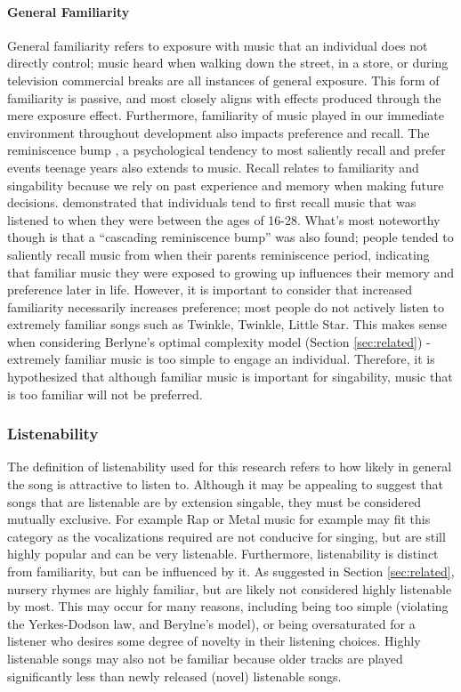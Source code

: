 \paragraph{General Familiarity}
General familiarity refers to exposure with music that an individual does not directly control; music heard when walking down the street, in a store, or during television commercial breaks are all instances of general exposure. This form of familiarity is passive, and most closely aligns with effects produced through the mere exposure effect. Furthermore, familiarity of music played in our immediate environment throughout development also impacts preference and recall. The reminiscence bump \cite{rubin8c}, a psychological tendency to most saliently recall and prefer events teenage years also extends to music. Recall relates to familiarity and singability because we rely on past experience and memory when making future decisions. \cite{Krumhansl2013} demonstrated that individuals tend to first recall music that was listened to when they were between the ages of 16-28. What's most noteworthy though is that a ``cascading reminiscence bump'' was also found; people tended to saliently recall music from when their parents reminiscence period, indicating that familiar music they were exposed to growing up influences their memory and preference later in life. However, it is important to consider that increased familiarity necessarily increases preference; most people do not actively listen to extremely familiar songs such as Twinkle, Twinkle, Little Star. This makes sense when considering Berlyne's optimal complexity model (Section \ref{sec:related}) - extremely familiar music is too simple to engage an individual. Therefore, it is hypothesized that although familiar music is important for singability, music that is too familiar will not be preferred.

\subsubsection{Listenability}
The definition of listenability used for this research refers to how likely in general the song is attractive to listen to. Although it may be appealing to suggest that songs that are listenable are by extension singable, they must be considered mutually exclusive. For example Rap or Metal music for example may fit this category as the vocalizations required are not conducive for singing, but are still highly popular and can be very listenable. Furthermore, listenability is distinct from familiarity, but can be influenced by it. As suggested in Section \ref{sec:related}, nursery rhymes are highly familiar, but are likely not considered highly listenable by most. This may occur for many reasons, including being too simple (violating the Yerkes-Dodson law, and Berylne's model), or being oversaturated for a listener who desires some degree of novelty in their listening choices. Highly listenable songs may also not be familiar because older tracks are played significantly less than newly released (novel) listenable songs. 

